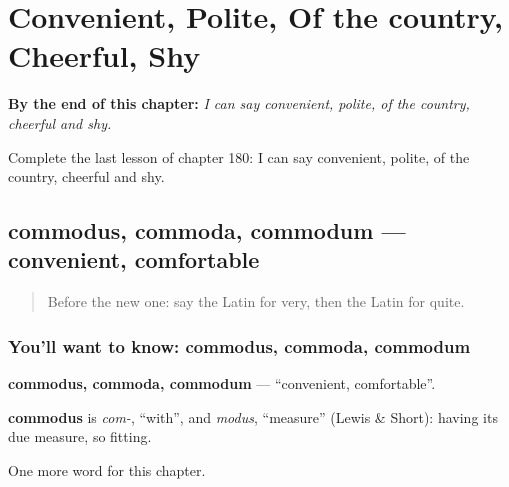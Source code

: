 
\chapter{Convenient, Polite, Of the country, Cheerful, Shy}
\label{ch:la-convenient-polite-of-the-country-cheerful-shy}

\begin{chapteropening}
\textbf{By the end of this chapter:} \emph{I can say convenient, polite, of the country, cheerful and shy.}

Complete the last lesson of chapter 180: I can say convenient, polite, of the country, cheerful and shy.
\end{chapteropening}

\section[commodus, commoda, commodum]{commodus, commoda, commodum — convenient, comfortable}

\label{lesson:LA-C180-commodus}



\begin{quote}
Before the new one: say the Latin for very, then the Latin for quite.
\end{quote}

\subsection*{You'll want to know: commodus, commoda, commodum}
\textbf{commodus, commoda, commodum} — \textquotedblleft{}convenient, comfortable\textquotedblright{}.

\begin{cousinweb}
\textbf{commodus} is \emph{com-}, \textquotedblleft{}with\textquotedblright{}, and \emph{modus}, \textquotedblleft{}measure\textquotedblright{} (Lewis \& Short): having its due measure, so fitting.
\end{cousinweb}

\begin{grammarlens}[title={What you've built}]
One more word for this chapter.
\end{grammarlens}

